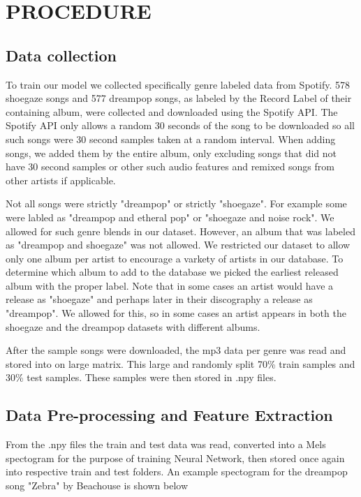 \documentclass[letterpaper, 12 pt, conference]{ieeeconf}  %
\begin{document}
\section{PROCEDURE}


\subsection{Data collection}

To train our model we collected specifically genre labeled data from Spotify. 578 shoegaze songs and 577 dreampop songs, as labeled by the Record Label of their containing album, were collected and downloaded using the Spotify API.
The Spotify API only allows a random 30 seconds of the song to be downloaded so all such songs were 30 second samples taken at a random interval. When adding  songs, we added them by the entire album, only excluding songs that did not have 30 second samples or other such audio features and remixed songs from other artists if applicable.

Not all songs were strictly "dreampop" or strictly "shoegaze". For example some were labled as "dreampop and etheral pop" or "shoegaze and noise rock". We allowed for such genre blends in our dataset. However, an album that was labeled as "dreampop and shoegaze" was not allowed. We restricted our dataset to allow only one album per artist to encourage a varkety of artists in our database. To determine which album to add to the database we picked the earliest released album with the proper label. Note that in some cases an artist would have a release as "shoegaze" and perhaps later in their discography a release as "dreampop". We allowed for this, so in some cases an artist appears in both the shoegaze and the dreampop datasets with different albums. 

After the sample songs were downloaded, the mp3 data per genre was read and stored into on large matrix. This large and randomly split 70\% train samples and 30\% test samples. These samples were then stored in .npy files.

\subsection{Data Pre-processing and Feature Extraction}
From the .npy files the train and test data was read, converted into a Mels spectogram for the purpose of training Neural Network, then stored once again into respective train and test folders. An example spectogram for the dreampop song "Zebra" by Beachouse is shown below
\end{document}
